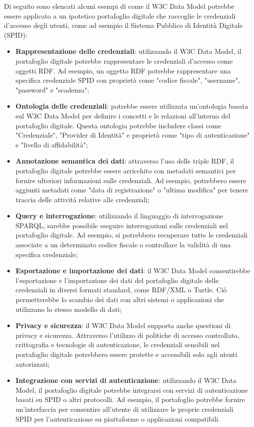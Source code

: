 Di seguito sono elencati alcuni esempi di come il W3C Data Model potrebbe essere applicato a un ipotetico portafoglio digitale che raccoglie le credenziali d'accesso degli utenti, come ad esempio il Sistema Pubblico di Identità Digitale (SPID):
\begin{itemize}
    \item \textbf{Rappresentazione delle credenziali}: utilizzando il W3C Data Model, il portafoglio digitale potrebbe rappresentare le credenziali d'accesso come oggetti RDF. Ad esempio, un oggetto RDF potrebbe rappresentare una specifica credenziale SPID con proprietà come "codice fiscale", "username", "password" e "scadenza";
    \item \textbf{Ontologia delle credenziali}: potrebbe essere utilizzata un'ontologia basata sul W3C Data Model per definire i concetti e le relazioni all'interno del portafoglio digitale. Questa ontologia potrebbe includere classi come "Credenziale", "Provider di Identità" e proprietà come "tipo di autenticazione" e "livello di affidabilità";
    \item \textbf{Annotazione semantica dei dati}: attraverso l'uso delle triple RDF, il portafoglio digitale potrebbe essere arricchito con metadati semantici per fornire ulteriori informazioni sulle credenziali. Ad esempio, potrebbero essere aggiunti metadati come "data di registrazione" o "ultima modifica" per tenere traccia delle attività relative alle credenziali;
    \item \textbf{Query e interrogazione}: utilizzando il linguaggio di interrogazione SPARQL, sarebbe possibile eseguire interrogazioni sulle credenziali nel portafoglio digitale. Ad esempio, si potrebbero recuperare tutte le credenziali associate a un determinato codice fiscale o controllare la validità di una specifica credenziale;
    \item \textbf{Esportazione e importazione dei dati}: il W3C Data Model consentirebbe l'esportazione e l'importazione dei dati del portafoglio digitale delle credenziali in diversi formati standard, come RDF/XML o Turtle. Ciò permetterebbe lo scambio dei dati con altri sistemi o applicazioni che utilizzano lo stesso modello di dati;
    \item \textbf{Privacy e sicurezza}: il W3C Data Model supporta anche questioni di privacy e sicurezza. Attraverso l'utilizzo di politiche di accesso controllato, crittografia e tecnologie di autenticazione, le credenziali sensibili nel portafoglio digitale potrebbero essere protette e accessibili solo agli utenti autorizzati;
    \item \textbf{Integrazione con servizi di autenticazione}: utilizzando il W3C Data Model, il portafoglio digitale potrebbe integrarsi con servizi di autenticazione basati su SPID o altri protocolli. Ad esempio, il portafoglio potrebbe fornire un'interfaccia per consentire all'utente di utilizzare le proprie credenziali SPID per l'autenticazione su piattaforme o applicazioni compatibili.
\end{itemize}

